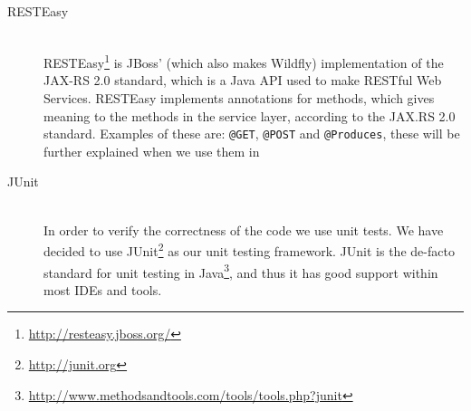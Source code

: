 \begin{description}
    \item[RESTEasy] \hfill \\
        RESTEasy\footnote{\url{http://resteasy.jboss.org/}} is JBoss' (which also makes Wildfly) implementation of the JAX-RS 2.0 standard, which is a Java API used to make RESTful Web Services.
        RESTEasy implements annotations for methods, which gives meaning to the methods in the service layer, according to the JAX.RS 2.0 standard.
        Examples of these are: \texttt{@GET}, \texttt{@POST} and \texttt{@Produces}, these will be further explained when we use them in 
    
    \item[JUnit] \hfill \\
        In order to verify the correctness of the code we use unit tests.
        We have decided to use JUnit\footnote{\url{http://junit.org}} as our unit testing framework.
        JUnit is the de-facto standard for unit testing in Java\footnote{\url{http://www.methodsandtools.com/tools/tools.php?junit}}, and thus it has good support within most IDEs and tools.

\end{description}
